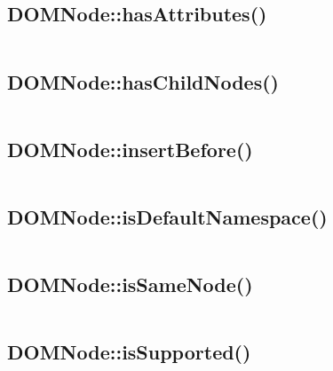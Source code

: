 \subsection{DOMNode::hasAttributes()}



\begin{lstlisting}[language=PHP]

\end{lstlisting}



\subsection{DOMNode::hasChildNodes()}


\begin{lstlisting}[language=PHP]

\end{lstlisting}


\subsection{DOMNode::insertBefore()}



\begin{lstlisting}[language=PHP]

\end{lstlisting}


\subsection{DOMNode::isDefaultNamespace()}


\begin{lstlisting}[language=PHP]

\end{lstlisting}


\subsection{DOMNode::isSameNode()}


\begin{lstlisting}[language=PHP]

\end{lstlisting}


\subsection{DOMNode::isSupported()}


